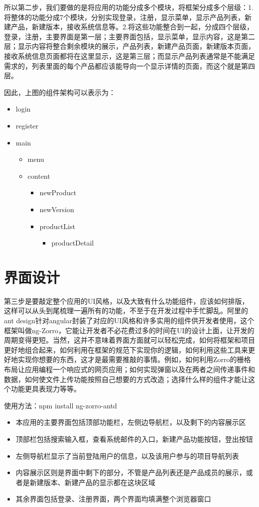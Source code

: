 所以第二步，我们要做的是将应用的功能分成多个模块，将框架分成多个层级：1. 将整体的功能分成7个模块，分别实现登录，注册，显示菜单，显示产品列表，新建产品，新建版本，接收系统信息等。2.将这些功能整合到一起，分成四个层级，登录，注册，主要界面是第一层；主要界面包括，显示菜单，显示内容，这是第二层；显示内容将整合剩余模块的展示，产品列表，新建产品页面，新建版本页面，接收系统信息页面都将在这里显示，这是第三层；而显示产品列表通常是不能满足需求的，列表里面的每个产品都应该能导向一个显示详情的页面，而这个就是第四层。

因此，上图的组件架构可以表示为：
\begin{itemize}
	\item login
	\item register
	\item main
	\begin{itemize}
		\item menu
		\item content
			\begin{itemize}
				\item newProduct
				\item newVersion
				\item productList
				\begin{itemize}
					\item productDetail
				\end{itemize}
			\end{itemize}
	\end{itemize}
\end{itemize}
\section{界面设计}
\label{sec:UI}
第三步是要敲定整个应用的UI风格，以及大致有什么功能组件，应该如何排版，这样可以从头到尾梳理一遍所有的功能，不至于在开发过程中手忙脚乱。阿里的ant design\cite{Zorro}针对angular封装了对应的UI风格和许多实用的组件供开发者使用，这个框架叫做ng-Zorro，它能让开发者不必花费过多的时间在UI的设计上面，让开发的周期变得更短。当然，这并不意味着界面方面就可以轻松完成，如何将框架和项目更好地组合起来，如何利用在框架的规范下实现你的逻辑，如何利用这些工具来更好地实现你想要的东西，这才是最需要推敲的事情。例如，如何利用Zorro的栅格布局让应用编程一个响应式的网页应用；如何实现弹窗以及在两者之间传递事件和数据，如何使文件上传功能按照自己想要的方式改造；选择什么样的组件才能让这个功能更具表现力等等。
		
使用方法：npm install ng-zorro-antd
\begin{itemize}
	\item 本应用的主要界面包括顶部功能栏，左侧边导航栏，以及剩下的内容展示区
	\item 顶部栏包括搜索输入框，查看系统邮件的入口，新建产品功能按钮，登出按钮
	\item 左侧导航栏显示了当前登陆用户的信息，以及该用户参与的项目导航列表
	\item 内容展示区则是界面中剩下的部分，不管是产品列表还是产品成员的展示，或者是新建版本、新建产品的显示都在这块区域
	\item 其余界面包括登录、注册界面，两个界面均填满整个浏览器窗口
\end{itemize}

